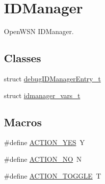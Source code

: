 \hypertarget{group___i_d_manager}{}\section{I\+D\+Manager}
\label{group___i_d_manager}


Open\+W\+SN I\+D\+Manager.  


\subsection*{Classes}
\begin{DoxyCompactItemize}
\item 
struct \hyperlink{structdebug_i_d_manager_entry__t}{debug\+I\+D\+Manager\+Entry\+\_\+t}
\item 
struct \hyperlink{structidmanager__vars__t}{idmanager\+\_\+vars\+\_\+t}
\end{DoxyCompactItemize}
\subsection*{Macros}
\begin{DoxyCompactItemize}
\item 
\#define \hyperlink{group___i_d_manager_ga75a645b8c3a1fdda2c11bb1ec2a0f440}{A\+C\+T\+I\+O\+N\+\_\+\+Y\+ES}~\textquotesingle{}Y\textquotesingle{}
\item 
\#define \hyperlink{group___i_d_manager_ga7a8c6698e6d3bf6fb3528ba07aa8d5eb}{A\+C\+T\+I\+O\+N\+\_\+\+NO}~\textquotesingle{}N\textquotesingle{}
\item 
\#define \hyperlink{group___i_d_manager_ga935e9aef6a097c624a9b3b6147fbf197}{A\+C\+T\+I\+O\+N\+\_\+\+T\+O\+G\+G\+LE}~\textquotesingle{}T\textquotesingle{}
\end{DoxyCompactItemize}
